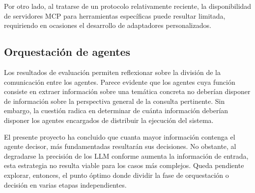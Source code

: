 Por otro lado, al tratarse de un protocolo relativamente reciente, la disponibilidad de servidores MCP para herramientas específicas puede resultar limitada, requiriendo en ocasiones el desarrollo de adaptadores personalizados. 

\subsection{Orquestación de agentes}
\label{sec:conc}
Los resultados de evaluación permiten reflexionar sobre la división de la comunicación entre los agentes. Parece evidente que los agentes cuya función consiste en extraer información sobre una temática concreta no deberían disponer de información sobre la perspectiva general de la consulta pertinente. Sin embargo, la cuestión radica en determinar de cuánta información deberían disponer los agentes encargados de distribuir la ejecución del sistema.

El presente proyecto ha concluido que cuanta mayor información contenga el agente decisor, más fundamentadas resultarán sus decisiones. No obstante, al degradarse la precisión de los LLM conforme aumenta la información de entrada, esta estrategia no resulta viable para los casos más complejos. Queda pendiente explorar, entonces, el punto óptimo donde dividir la fase de orquestación o decisión en varias etapas independientes.


